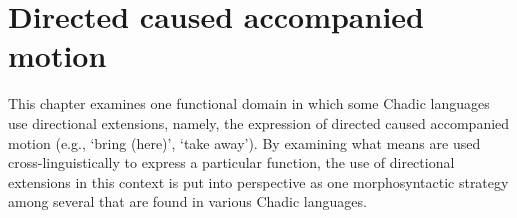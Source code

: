 \chapter{Directed caused accompanied motion} \label{ch:CAM}



This chapter examines one functional domain in which some Chadic languages use directional extensions, namely, the expression of directed caused accompanied motion (e.g., `bring (here)', `take away'). By examining what means are used cross-linguistically to express a particular function, the use of directional extensions in this context is put into perspective as one morphosyntactic strategy among several that are found in various Chadic languages. 

